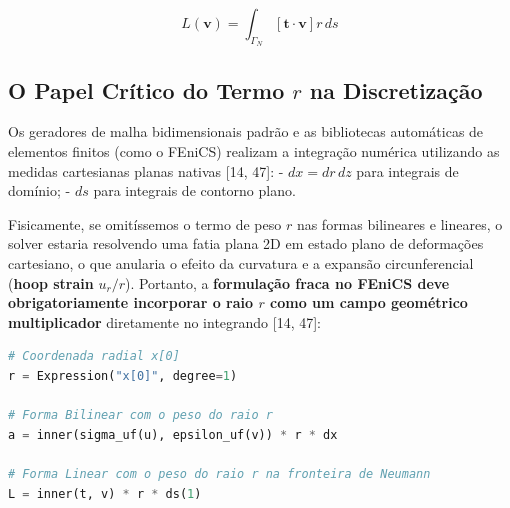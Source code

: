 \begin{equation}
  L(\mathbf{v}) = \int_{\Gamma_N} \left[ \mathbf{t} \cdot \mathbf{v} \right] r \, d s
  \label{eq:linear_form}
\end{equation}

\subsection{O Papel Crítico do Termo $r$ na Discretização}

Os geradores de malha bidimensionais padrão e as bibliotecas automáticas de elementos finitos (como o FEniCS) realizam a integração numérica utilizando as medidas cartesianas planas nativas [14, 47]:
- $dx = dr \, dz$ para integrais de domínio;
- $ds$ para integrais de contorno plano.

Fisicamente, se omitíssemos o termo de peso $r$ nas formas bilineares e lineares, o solver estaria resolvendo uma fatia plana 2D em estado plano de deformações cartesiano, o que anularia o efeito da curvatura e a expansão circunferencial (\textbf{hoop strain} $u_r/r$). Portanto, a \textbf{formulação fraca no FEniCS deve obrigatoriamente incorporar o raio $r$ como um campo geométrico multiplicador} diretamente no integrando [14, 47]:

\begin{lstlisting}[language=Python, caption={Implementação conceitual da forma fraca no FEniCS (UFL).}]
# Coordenada radial x[0]
r = Expression("x[0]", degree=1) 

# Forma Bilinear com o peso do raio r
a = inner(sigma_uf(u), epsilon_uf(v)) * r * dx

# Forma Linear com o peso do raio r na fronteira de Neumann
L = inner(t, v) * r * ds(1)
\end{lstlisting}